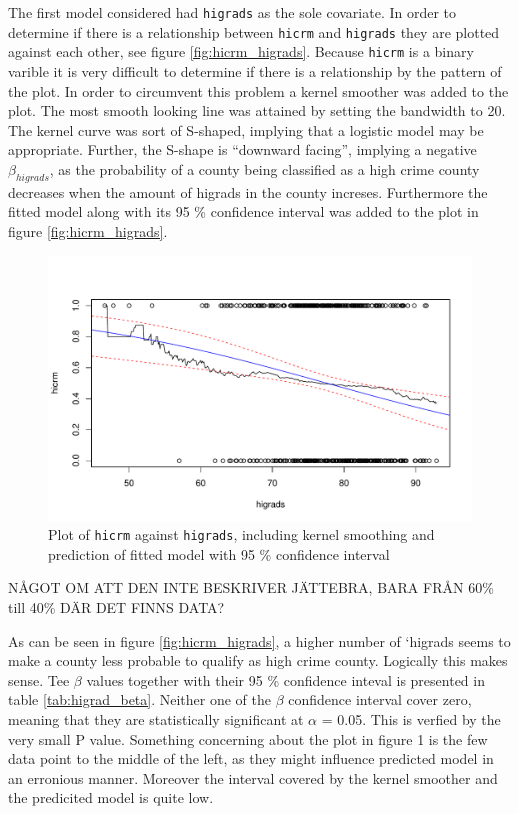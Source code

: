 \documentclass[a4paper]{article}
\begin{document}
The first model considered had \texttt{higrads} as the sole covariate.
In order to determine if there is a relationship between \texttt{hicrm}
and \texttt{higrads} they are plotted against each other, see figure
\ref{fig:hicrm_higrads}. Because \texttt{hicrm} is a binary varible it
is very difficult to determine if there is a relationship by the pattern
of the plot. In order to circumvent this problem a kernel smoother was
added to the plot. The most smooth looking line was attained by setting
the bandwidth to 20. The kernel curve was sort of S-shaped, implying
that a logistic model may be appropriate. Further, the S-shape is
``downward facing'', implying a negative \(\beta_{higrads}\), as the
probability of a county being classified as a high crime county
decreases when the amount of higrads in the county increses. Furthermore
the fitted model along with its 95 \% confidence interval was added to
the plot in figure \ref{fig:hicrm_higrads}.

\begin{figure}[h]
\includegraphics{Project_2_files/figure-latex/unnamed-chunk-2-1} \caption{\label{fig:hicrm_higrads}Plot of \texttt{hicrm} against \texttt{higrads}, including kernel smoothing and prediction of fitted model with 95 \% confidence interval}\label{fig:unnamed-chunk-2}
\end{figure}

NÅGOT OM ATT DEN INTE BESKRIVER JÄTTEBRA, BARA FRÅN 60\% till 40\% DÄR
DET FINNS DATA?

As can be seen in figure \ref{fig:hicrm_higrads}, a higher number of
`higrads seems to make a county less probable to qualify as high crime
county. Logically this makes sense. Tee \(\beta\) values together with
their 95 \% confidence inteval is presented in table
\ref{tab:higrad_beta}. Neither one of the \(\beta\) confidence interval
cover zero, meaning that they are statistically significant at
\(\alpha\) = 0.05. This is verfied by the very small P value. Something
concerning about the plot in figure 1 is the few data point to the
middle of the left, as they might influence predicted model in an
erronious manner. Moreover the interval covered by the kernel smoother
and the predicited model is quite low.
\end{document}
